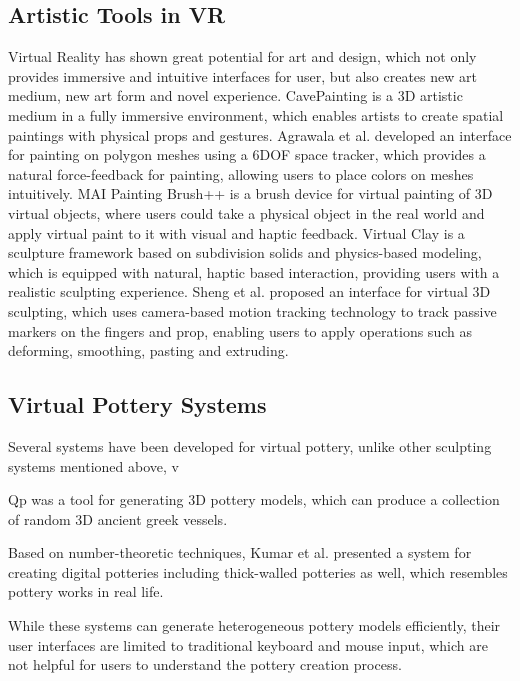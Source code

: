 \subsection{Artistic Tools in VR}
\label{sec:2.2}
Virtual Reality has shown great potential for art and design, which not only provides immersive and intuitive interfaces for user, but also creates new art medium, new art form and novel experience\cite{laviola20113d}. CavePainting \cite{keefe2001cavepainting} is a 3D artistic medium in a fully immersive environment, which enables artists to create spatial paintings with physical props and gestures. Agrawala et al.\cite{agrawala19953d} developed an interface for painting on polygon meshes using a 6DOF space tracker, which provides a natural force-feedback for painting, allowing users to place colors on meshes intuitively. MAI Painting Brush++ \cite{otsuki2017brush} is a brush device for virtual painting of 3D virtual objects, where users could take a physical object in the real world and apply virtual paint to it with visual and haptic feedback. Virtual Clay \cite{mcdonnell2001virtual} is a sculpture framework based on subdivision solids and physics-based modeling, which is equipped with natural, haptic based interaction, providing users with a realistic sculpting experience. Sheng et al. \cite{sheng2006interface} proposed an interface for virtual 3D sculpting, which uses camera-based motion tracking technology to track passive markers on the fingers and prop, enabling users to apply operations such as deforming, smoothing, pasting and extruding.

\subsection{Virtual Pottery Systems}
\label{sec:2.3}


Several systems have been developed for virtual pottery, unlike other sculpting systems mentioned above, v

Qp \cite{koutsoudis2009qp} was a tool for generating 3D pottery models, which can produce a collection of random 3D ancient greek vessels.

Based on number-theoretic techniques, Kumar et al. \cite{kumar2011wheel} presented a system for creating digital potteries including thick-walled potteries as well, which resembles pottery works in real life.

While these systems can generate heterogeneous pottery models efficiently, their user interfaces are limited to traditional keyboard and mouse input, which are not helpful for users to understand the pottery creation process.

